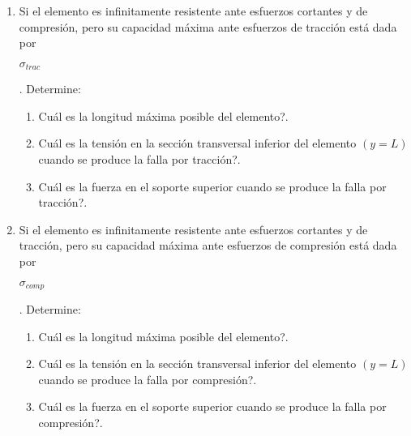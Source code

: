\documentclass[../notas medios.tex]{subfiles}
\begin{document}
\begin{enumerate}
\begin{enumerate}
\begin{enumerate}
		\end{enumerate}
%
		\item 	Si el elemento es infinitamente resistente ante esfuerzos cortantes y de compresi\'on, pero su capacidad m\'axima ante esfuerzos de tracci\'on est\'a dada por \begin{large} $\sigma_{trac}$ \end{large}. Determine:
		\begin{enumerate} 
			\item \textquestiondown Cu\'al es la longitud m\'axima posible del elemento?. 
			\item \textquestiondown Cu\'al es la tensi\'on en la secci\'on transversal inferior del elemento  $\left( y=L \right)$  cuando se produce la falla por tracci\'on?. 
			\item \textquestiondown Cu\'al es la fuerza en el soporte superior cuando se produce la falla por tracci\'on?.
		\end{enumerate}	
	
		\item	Si el elemento es infinitamente resistente ante esfuerzos cortantes y de tracci\'on, pero su capacidad m\'axima ante esfuerzos de compresi\'on est\'a dada por \begin{large} $\sigma_{comp}$ \end{large}. Determine: 
		\begin{enumerate}		
			\item \textquestiondown Cu\'al es la longitud m\'axima posible del elemento?. 
			\item \textquestiondown Cu\'al es la tensi\'on en la secci\'on transversal inferior del elemento  $\left( y=L \right)$  cuando se produce la falla por compresi\'on?. 
			\item \textquestiondown Cu\'al es la fuerza en el soporte superior cuando se produce la falla por compresi\'on?.
		\end{enumerate}
	\end{enumerate}



\end{enumerate}
\end{document}
